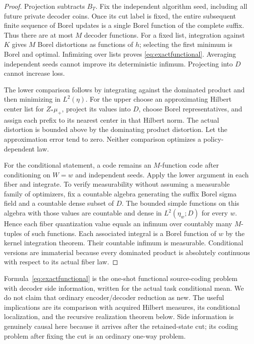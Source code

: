 \begin{proof}
Projection subtracts $B_T$. Fix the independent algorithm seed, including all future private decoder coins. Once its cut label is fixed, the entire subsequent finite sequence of Borel updates is a single Borel function of the complete suffix. Thus there are at most $M$ decoder functions. For a fixed list, integration against $K$ gives $M$ Borel distortions as functions of $h$; selecting the first minimum is Borel and optimal. Infimizing over lists proves \eqref{eq:exactfunctional}. Averaging independent seeds cannot improve its deterministic infimum. Projecting into $D$ cannot increase loss.

The lower comparison follows by integrating against the dominated product and then minimizing in $L^2(\eta)$. For the upper choose an approximating Hilbert center list for $Z_*\mu_+$, project its values into $D$, choose Borel representatives, and assign each prefix to its nearest center in that Hilbert norm. The actual distortion is bounded above by the dominating product distortion. Let the approximation error tend to zero. Neither comparison optimizes a policy-dependent law.

For the conditional statement, a code remains an $M$-function code after conditioning on $W=w$ and independent seeds. Apply the lower argument in each fiber and integrate. To verify measurability without assuming a measurable family of optimizers, fix a countable algebra generating the suffix Borel sigma field and a countable dense subset of $D$. The bounded simple functions on this algebra with those values are countable and dense in $L^2(\eta_w;D)$ for every $w$. Hence each fiber quantization value equals an infimum over countably many $M$-tuples of such functions. Each associated integral is a Borel function of $w$ by the kernel integration theorem. Their countable infimum is measurable. Conditional versions are immaterial because every dominated product is absolutely continuous with respect to its actual fiber law.
\end{proof}

Formula~\eqref{eq:exactfunctional} is the one-shot functional source-coding problem with decoder side information, written for the actual task conditional mean. We do not claim that ordinary encoder/decoder reduction as new. The useful implications are its comparison with acquired Hilbert measures, its conditional localization, and the recursive realization theorem below. Side information is genuinely causal here because it arrives after the retained-state cut; its coding problem after fixing the cut is an ordinary one-way problem.

